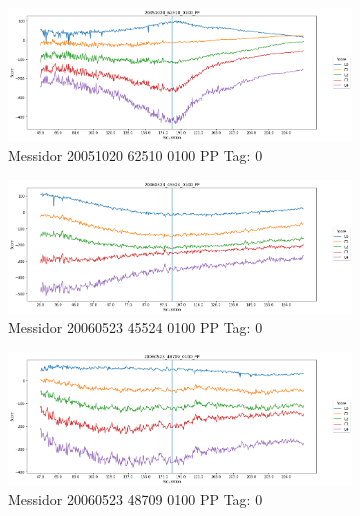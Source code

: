 \begin{figure}[ht!]
	\centering
	\begin{subfigure}[b]{ 0.85\textwidth}
		\centering
		\includegraphics[width=\textwidth]{Figures/chapter_stability/20051020_62510_0100_PP/s/scores.png}
		\caption{Messidor 20051020 62510 0100 PP Tag: 0}
	\end{subfigure}
	\begin{subfigure}[b]{ 0.85\textwidth}
		\centering
		\includegraphics[width=\textwidth]{Figures/chapter_stability/20060523_45524_0100_PP/s/scores.png}
		\caption{Messidor 20060523 45524 0100 PP Tag: 0}		
	\end{subfigure}	
	\begin{subfigure}[b]{ 0.85\textwidth}
		\centering
		\includegraphics[width=\textwidth]{Figures/chapter_stability/20060523_48709_0100_PP/s/scores.png}
		\caption{Messidor 20060523 48709 0100 PP Tag: 0}		
	\end{subfigure}
	\begin{subfigure}[b]{ 0.85\textwidth}

\end{subfigure}
\end{figure}
